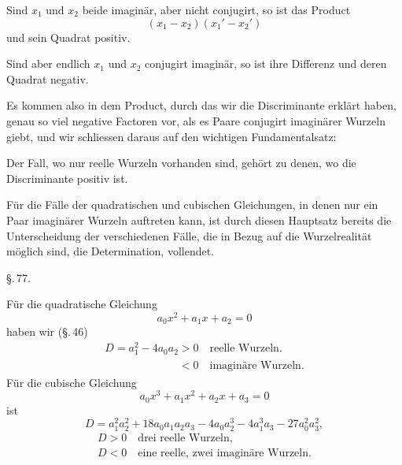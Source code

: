 Sind $x_1$ und $x_2$ beide imaginär, aber nicht conjugirt, so ist das Product
\[
(x_1 - x_2)(x_1' - x_2')
\]
und sein Quadrat positiv.

Sind aber endlich $x_1$ und $x_2$ conjugirt imaginär, so ist ihre Differenz  und deren Quadrat negativ.

Es kommen also in dem Product, durch das wir die Discriminante erklärt haben, genau so viel negative Factoren vor, als es Paare conjugirt imaginärer Wurzeln giebt, und wir schliessen daraus auf den wichtigen Fundamentalsatz:


Der Fall, wo nur reelle Wurzeln vorhanden sind, gehört zu denen, wo die Discriminante positiv ist.

Für die Fälle der quadratischen und cubischen Gleichungen, in denen nur ein Paar imaginärer Wurzeln auftreten kann, ist durch diesen Hauptsatz bereits die Unterscheidung der verschiedenen Fälle, die in Bezug auf die Wurzelrealität möglich sind, die Determination, vollendet.

\begin{center}
\S.\,77.

\end{center}

Für die quadratische Gleichung
\[
a_0 x^2 + a_1 x + a_2 = 0
\]
haben wir (\S.\,46)
\[
\begin{array}{l}
D = a_1^2 - 4a_0a_2 > 0 \quad \text{reelle Wurzeln.}\\
\phantom{D = a_1^2 - 4a_0a_2 } < 0 \quad \text{imaginäre Wurzeln.}
\end{array}
\]
Für die cubische Gleichung
\[
a_0 x^3 + a_1 x^2 + a_2 x + a_3 = 0
\]
ist
\[
D = a_1^2a_2^2 + 18a_0a_1a_2a_3 - 4a_0a_2^3 - 4a_1^3a_3 - 27a_0^2a_3^2,
\]
\[
\begin{array}{l}
D > 0 \quad \text{drei reelle Wurzeln,}\\
D < 0 \quad \text{eine reelle, zwei imaginäre Wurzeln.}
\end{array}
\]
